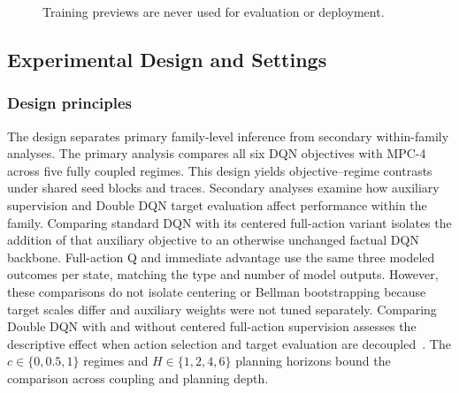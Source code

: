 \documentclass[remotesensing,article,submit,moreauthors]{Definitions/mdpi}
\begin{document}
\begin{figure}[H]
\centering
{}
\par\smallskip
\caption*{Training previews are never used for evaluation or deployment.}
\label{alg:cbad}
\end{figure}

\subsection{Experimental Design and Settings}
\label{sec:experiments}

\subsubsection{Design principles}

The design separates primary family-level inference from secondary within-family analyses. The primary analysis compares all six DQN objectives with MPC-4 across five fully coupled regimes. This design yields \DQNvsMPCContrastCount{} objective--regime contrasts under shared seed blocks and traces. Secondary analyses examine how auxiliary supervision and Double DQN target evaluation affect performance within the family. Comparing standard DQN with its centered full-action variant isolates the addition of that auxiliary objective to an otherwise unchanged factual DQN backbone. Full-action Q and immediate advantage use the same three modeled outcomes per state, matching the type and number of model outputs. However, these comparisons do not isolate centering or Bellman bootstrapping because target scales differ and auxiliary weights were not tuned separately. Comparing Double DQN with and without centered full-action supervision assesses the descriptive effect when action selection and target evaluation are decoupled~\cite{vanhasselt2016double}. The $c\in\{0,0.5,1\}$ regimes and $H\in\{1,2,4,6\}$ planning horizons bound the comparison across coupling and planning depth.
\end{document}
